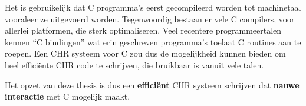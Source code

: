 Het is gebruikelijk dat C programma's eerst gecompileerd worden tot machinetaal vooraleer ze uitgevoerd worden. Tegenwoordig bestaan er vele C compilers, voor allerlei platformen, die sterk optimaliseren. Veel recentere programmeertalen kennen ``C bindingen'' wat erin geschreven programma's toelaat C routines aan te roepen. Een CHR systeem voor C zou dus de mogelijkheid kunnen bieden om heel effici\"ente CHR code te schrijven, die bruikbaar is vanuit vele talen.

Het opzet van deze thesis is dus een {\bf effici\"ent} CHR systeem schrijven dat {\bf nauwe interactie} met C mogelijk maakt.


